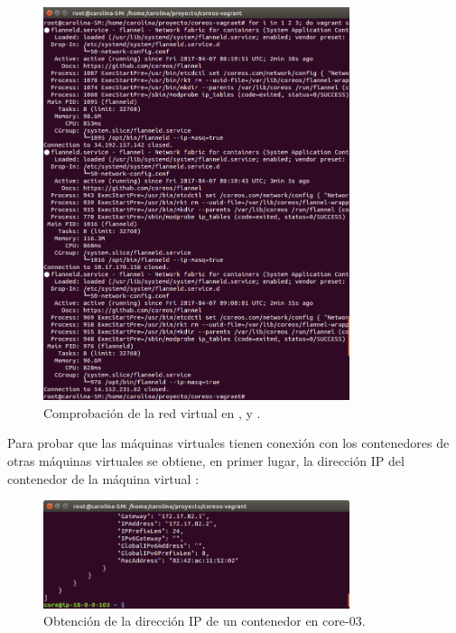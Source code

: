 \begin{figure}[H]
\centering
\includegraphics[width=0.8\textwidth]{images/figures/flanneld-aws-3.png}
\caption{Comprobación de la red virtual en ,  y .}
\end{figure}

Para probar que las máquinas virtuales tienen conexión con los contenedores de otras máquinas virtuales se obtiene, en primer lugar, la dirección IP del contenedor  de la máquina virtual :


\begin{figure}[H]
\centering
\includegraphics[width=0.8\textwidth]{images/figures/docker-inspect-3.png}
\caption{Obtención de la dirección IP de un contenedor en core-03.}
\end{figure}

